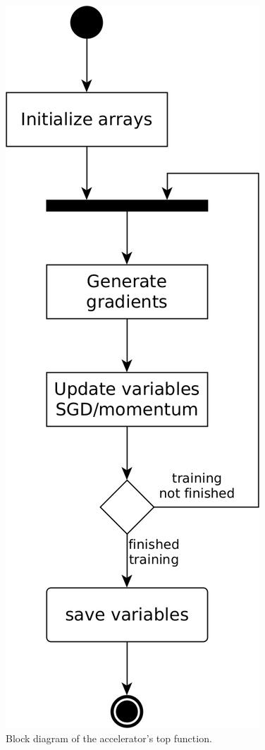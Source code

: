 \begin{figure}[H]
    \centering
        \includegraphics[height=0.4\textheight]{Images/block_diagrams/accel_top.png}
        \decoRule
        \caption[Top function]{Block diagram of the accelerator's top function.}
        \label{fig: top function}
\end{figure}


